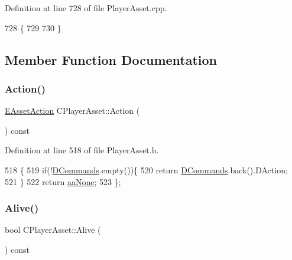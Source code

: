 Definition at line 728 of file Player\+Asset.\+cpp.


\begin{DoxyCode}
728                            \{
729     
730 \}
\end{DoxyCode}


\subsection{Member Function Documentation}
\hypertarget{classCPlayerAsset_ad9a1fdc2ca221636ccab01891ea1f951}{}\label{classCPlayerAsset_ad9a1fdc2ca221636ccab01891ea1f951} 
\subsubsection{\texorpdfstring{Action()}{Action()}}
{\footnotesize\ttfamily \hyperlink{GameDataTypes_8h_ab47668e651a3032cfb9c40ea2d60d670}{E\+Asset\+Action} C\+Player\+Asset\+::\+Action (\begin{DoxyParamCaption}{ }\end{DoxyParamCaption}) const\hspace{0.3cm}{\ttfamily [inline]}}



Definition at line 518 of file Player\+Asset.\+h.


\begin{DoxyCode}
518                                    \{
519             \textcolor{keywordflow}{if}(!\hyperlink{classCPlayerAsset_a4d3b96106d3b1c1020f98005884d2a87}{DCommands}.empty())\{
520                 \textcolor{keywordflow}{return} \hyperlink{classCPlayerAsset_a4d3b96106d3b1c1020f98005884d2a87}{DCommands}.back().DAction;
521             \}
522             \textcolor{keywordflow}{return} \hyperlink{GameDataTypes_8h_ab47668e651a3032cfb9c40ea2d60d670ac17cc5a0035320c060d7f8074143b507}{aaNone};
523         \};
\end{DoxyCode}
\hypertarget{classCPlayerAsset_a616d6139b57b9e74cca2559d7501ad3e}{}\label{classCPlayerAsset_a616d6139b57b9e74cca2559d7501ad3e} 
\subsubsection{\texorpdfstring{Alive()}{Alive()}}
{\footnotesize\ttfamily bool C\+Player\+Asset\+::\+Alive (\begin{DoxyParamCaption}{ }\end{DoxyParamCaption}) const\hspace{0.3cm}{\ttfamily [inline]}}



